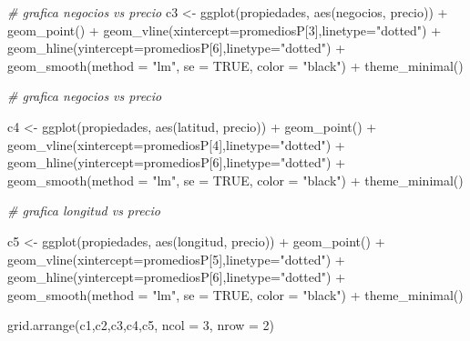\documentclass[
]{article}
\newenvironment{Shaded}{\begin{snugshade}}{\end{snugshade}}
\newcommand{\AttributeTok}[1]{\textcolor[rgb]{0.77,0.63,0.00}{#1}}
\newcommand{\CommentTok}[1]{\textcolor[rgb]{0.56,0.35,0.01}{\textit{#1}}}
\newcommand{\ConstantTok}[1]{\textcolor[rgb]{0.00,0.00,0.00}{#1}}
\newcommand{\DecValTok}[1]{\textcolor[rgb]{0.00,0.00,0.81}{#1}}
\newcommand{\FunctionTok}[1]{\textcolor[rgb]{0.00,0.00,0.00}{#1}}
\newcommand{\NormalTok}[1]{#1}
\newcommand{\OtherTok}[1]{\textcolor[rgb]{0.56,0.35,0.01}{#1}}
\newcommand{\SpecialCharTok}[1]{\textcolor[rgb]{0.00,0.00,0.00}{#1}}
\newcommand{\StringTok}[1]{\textcolor[rgb]{0.31,0.60,0.02}{#1}}
\begin{document}
\begin{Shaded}
\begin{Highlighting}[]
\CommentTok{\# grafica negocios vs precio}
\NormalTok{c3 }\OtherTok{\textless{}{-}} \FunctionTok{ggplot}\NormalTok{(propiedades, }\FunctionTok{aes}\NormalTok{(negocios, precio)) }\SpecialCharTok{+} 
  \FunctionTok{geom\_point}\NormalTok{() }\SpecialCharTok{+}
  \FunctionTok{geom\_vline}\NormalTok{(}\AttributeTok{xintercept=}\NormalTok{promediosP[}\DecValTok{3}\NormalTok{],}\AttributeTok{linetype=}\StringTok{"dotted"}\NormalTok{) }\SpecialCharTok{+} 
  \FunctionTok{geom\_hline}\NormalTok{(}\AttributeTok{yintercept=}\NormalTok{promediosP[}\DecValTok{6}\NormalTok{],}\AttributeTok{linetype=}\StringTok{"dotted"}\NormalTok{) }\SpecialCharTok{+} 
   \FunctionTok{geom\_smooth}\NormalTok{(}\AttributeTok{method =} \StringTok{"lm"}\NormalTok{, }\AttributeTok{se =} \ConstantTok{TRUE}\NormalTok{, }\AttributeTok{color =} \StringTok{"black"}\NormalTok{) }\SpecialCharTok{+}
  \FunctionTok{theme\_minimal}\NormalTok{()}

\CommentTok{\# grafica negocios vs precio}

\NormalTok{c4 }\OtherTok{\textless{}{-}} \FunctionTok{ggplot}\NormalTok{(propiedades, }\FunctionTok{aes}\NormalTok{(latitud, precio)) }\SpecialCharTok{+} 
  \FunctionTok{geom\_point}\NormalTok{() }\SpecialCharTok{+}
  \FunctionTok{geom\_vline}\NormalTok{(}\AttributeTok{xintercept=}\NormalTok{promediosP[}\DecValTok{4}\NormalTok{],}\AttributeTok{linetype=}\StringTok{"dotted"}\NormalTok{) }\SpecialCharTok{+} 
  \FunctionTok{geom\_hline}\NormalTok{(}\AttributeTok{yintercept=}\NormalTok{promediosP[}\DecValTok{6}\NormalTok{],}\AttributeTok{linetype=}\StringTok{"dotted"}\NormalTok{) }\SpecialCharTok{+} 
   \FunctionTok{geom\_smooth}\NormalTok{(}\AttributeTok{method =} \StringTok{"lm"}\NormalTok{, }\AttributeTok{se =} \ConstantTok{TRUE}\NormalTok{, }\AttributeTok{color =} \StringTok{"black"}\NormalTok{) }\SpecialCharTok{+}
  \FunctionTok{theme\_minimal}\NormalTok{()}

\CommentTok{\# grafica longitud vs precio}

\NormalTok{c5 }\OtherTok{\textless{}{-}} \FunctionTok{ggplot}\NormalTok{(propiedades, }\FunctionTok{aes}\NormalTok{(longitud, precio)) }\SpecialCharTok{+} 
  \FunctionTok{geom\_point}\NormalTok{() }\SpecialCharTok{+}
  \FunctionTok{geom\_vline}\NormalTok{(}\AttributeTok{xintercept=}\NormalTok{promediosP[}\DecValTok{5}\NormalTok{],}\AttributeTok{linetype=}\StringTok{"dotted"}\NormalTok{) }\SpecialCharTok{+} 
  \FunctionTok{geom\_hline}\NormalTok{(}\AttributeTok{yintercept=}\NormalTok{promediosP[}\DecValTok{6}\NormalTok{],}\AttributeTok{linetype=}\StringTok{"dotted"}\NormalTok{) }\SpecialCharTok{+} 
   \FunctionTok{geom\_smooth}\NormalTok{(}\AttributeTok{method =} \StringTok{"lm"}\NormalTok{, }\AttributeTok{se =} \ConstantTok{TRUE}\NormalTok{, }\AttributeTok{color =} \StringTok{"black"}\NormalTok{) }\SpecialCharTok{+}
  \FunctionTok{theme\_minimal}\NormalTok{()}

\FunctionTok{grid.arrange}\NormalTok{(c1,c2,c3,c4,c5, }\AttributeTok{ncol =} \DecValTok{3}\NormalTok{, }\AttributeTok{nrow =} \DecValTok{2}\NormalTok{)}
\end{Highlighting}
\end{Shaded}
\end{document}
